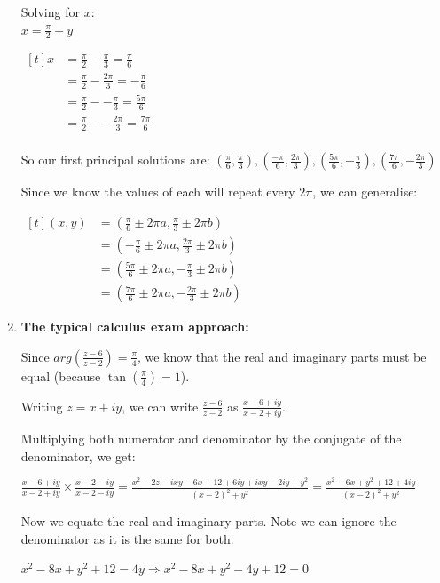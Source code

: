 \documentclass[../main.tex]{subfiles}
\begin{document}
\begin{enumerate}[itemsep=1cm]
    Solving for \(x\):\\
    \(x=\frac{\pi}{2}-y\)

    $
    \!
    \begin{aligned}[t]
        x
        &=\frac{\pi}{2}-\frac{\pi}{3}=\frac{\pi}{6}\\
        &=\frac{\pi}{2}-\frac{2\pi}{3}=-\frac{\pi}{6}\\
        &=\frac{\pi}{2}--\frac{\pi}{3}=\frac{5\pi}{6}\\
        &=\frac{\pi}{2}--\frac{2\pi}{3}=\frac{7\pi}{6}\\
    \end{aligned}
    $

    So our first principal solutions are: \((\frac{\pi}{6}, \frac{\pi}{3}), (\frac{-\pi}{6}, \frac{2\pi}{3}), (\frac{5\pi}{6}, -\frac{\pi}{3}), (\frac{7\pi}{6}, -\frac{2\pi}{3})\)
    
    Since we know the values of each will repeat every \(2\pi\), we can generalise:

    $
    \!
    \begin{aligned}[t]
        (x,y)
        &=(\frac{\pi}{6}\pm 2\pi a, \frac{\pi}{3}\pm 2\pi b)\\
        &=(-\frac{\pi}{6}\pm 2\pi a, \frac{2\pi}{3}\pm 2\pi b)\\
        &=(\frac{5\pi}{6}\pm 2\pi a, -\frac{\pi}{3}\pm 2\pi b)\\
        &=(\frac{7\pi}{6}\pm 2\pi a, -\frac{2\pi}{3}\pm 2\pi b)
    \end{aligned}
    $

    \item 
    \textbf{The typical calculus exam approach:}

    Since $arg{(\frac{z-6}{z-2})}=\frac{\pi}{4}$, we know that the real and imaginary parts must be equal (because $\tan(\frac{\pi}{4})=1$).

    Writing $z=x+iy$, we can write $\frac{z-6}{z-2}$ as $\frac{x-6+iy}{x-2+iy}$.

    Multiplying both numerator and denominator by the conjugate of the denominator, we get:

    $\frac{x-6+iy}{x-2+iy}\times \frac{x-2-iy}{x-2-iy}=\frac{x^2-2z-ixy-6x+12+6iy+ixy-2iy+y^2}{(x-2)^2+y^2}=\frac{x^2-6x+y^2+12+4iy}{(x-2)^2+y^2}$

    Now we equate the real and imaginary parts. Note we can ignore the denominator as it is the same for both.

    $x^2-8x+y^2+12=4y \Rightarrow x^2-8x+y^2-4y+12=0$


\end{enumerate}
\end{document}
